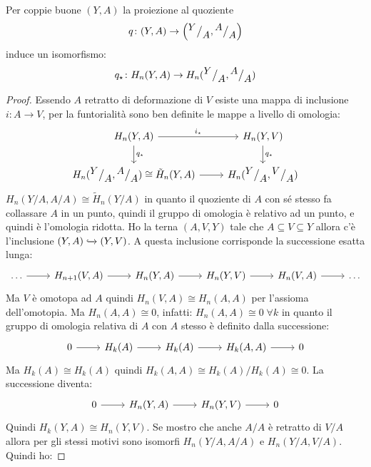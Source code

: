 \begin{lemma}
  Per coppie buone $ (Y,A) $ la proiezione al quoziente
  \[
    q \colon (Y,A) \to \left({^{\textstyle Y}\big/_{\textstyle A}}, {^{\textstyle A}\big/_{\textstyle A}} \right)
  \]
  induce un isomorfismo:
  \[
    q_\star \colon H_n(Y,A) \to  H_n({^{\textstyle Y}\big/_{\textstyle A}}, {^{\textstyle A}\big/_{\textstyle A}})
  \]
\end{lemma}
\begin{proof}
  Essendo $ A $ retratto di deformazione di $ V $ esiste
  una mappa di inclusione $ i \colon A \to V $, per la funtorialità
  sono ben definite le mappe a livello di omologia:
  \[
    \begin{tikzcd}
      H_n(Y,A) \rar{i_\star} \dar{q_\star} & H_n(Y,V) \dar{q_\star} \\
      H_n(\quot{Y}{A}, \quot{A}{A}) \cong \tilde{H}_n(Y,A) \rar & H_n(\quot{Y}{A}, \quot{V}{A})
    \end{tikzcd}
  \]
  $  H_n({Y} \slash {A}, {A} \slash {A}) \cong \tilde{H}_n({Y} \slash {A}) $ in quanto il quoziente
  di $ A $ con sé stesso fa collassare $ A $ in un punto, quindi il gruppo di omologia
  è relativo ad un punto, e quindi è l'omologia ridotta.
  Ho la terna $ (A, V, Y) $ tale che $ A \subseteq V \subseteq Y $ allora c'è l'inclusione
  $ (Y,A) \xhookrightarrow{} (Y,V) $. A questa inclusione corrisponde la successione esatta lunga:
  \[
    \begin{tikzcd}
      \dots \rar & H_{n+1}(V, A) \rar & H_n(Y, A) \rar & H_n(Y,V) \rar & H_{n}(V,A) \rar & \dots
    \end{tikzcd}
  \]
  Ma $ V $ è omotopa ad $ A $ quindi $ H_n(V,A) \cong H_n(A,A) $ per l'assioma dell'omotopia.
  Ma $ H_n(A,A) \cong 0 $, infatti:
  $ H_n(A,A) \cong 0 \; \forall k $ in quanto il gruppo di omologia relativa
  di $ A $ con $ A $ stesso è definito dalla successione:
  \[
    \begin{tikzcd}
      0 \rar   & H_k(A) \rar  & H_k(A) \rar  & H_k(A,A) \rar & 0
    \end{tikzcd}
  \]
  Ma $ H_k(A) \cong H_k(A) $ quindi  $ H_k(A,A) \cong {H_k(A)} \slash {H_k(A)} \cong 0 $.
  La successione diventa:
  \[
    \begin{tikzcd}
      0 \rar & H_n(Y, A) \rar & H_n(Y,V) \rar & 0
    \end{tikzcd}
  \]
  Quindi $ H_k(Y,A) \cong H_n(Y,V) $.
  Se mostro che anche $ {A} \slash {A} $ è retratto di $ {V} \slash {A} $
  allora per  gli stessi motivi sono isomorfi
  $ H_n({Y} \slash {A}, {A} \slash {A}) $ e $ H_n({Y} \slash {A}, {V} \slash {A}) $.
  Quindi ho:

\end{proof}
